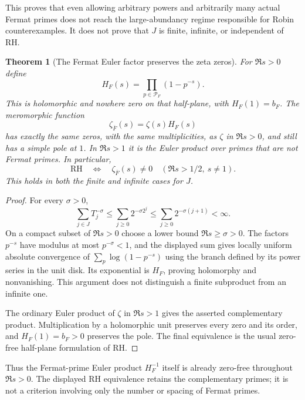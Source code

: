 \documentclass[11pt]{article}
\newtheorem{theorem}{Theorem}[section]
\theoremstyle{definition}
\begin{document}
This proves that even allowing arbitrary powers and arbitrarily
many actual Fermat primes does not reach the large-abundancy
regime responsible for Robin counterexamples. It does not prove
that $J$ is finite, infinite, or independent of RH.

\begin{theorem}[The Fermat Euler factor preserves the zeta zeros]
\label{thm:fermat-euler-zero-preservation}
For $\Re s>0$ define
\[
 H_F(s)=\prod_{p\in\mathcal P_F}(1-p^{-s}).
\]
This is holomorphic and nowhere zero on that half-plane, with
$H_F(1)=b_F$. The meromorphic function
\[
 \zeta_{\overline F}(s)=\zeta(s)H_F(s)
\]
has exactly the same zeros, with the same multiplicities, as
$\zeta$ in $\Re s>0$, and still has a simple pole at $1$.
In $\Re s>1$ it is the Euler product over primes that are not
Fermat primes. In particular,
\[
 \mathrm{RH}\quad\Longleftrightarrow\quad
 \zeta_{\overline F}(s)\ne0
 \quad(\Re s>1/2,\ s\ne1).
\]
This holds in both the finite and infinite cases for $J$.
\end{theorem}

\begin{proof}
For every $\sigma>0$,
\[
 \sum_{j\in J}T_j^{-\sigma}
 \le\sum_{j\ge0}2^{-\sigma 2^j}
 \le\sum_{j\ge0}2^{-\sigma(j+1)}<\infty.
\]
On a compact subset of $\Re s>0$ choose a lower bound
$\Re s\ge\sigma>0$. The factors $p^{-s}$ have modulus at most
$p^{-\sigma}<1$, and the displayed sum gives locally uniform
absolute convergence of $\sum_p\log(1-p^{-s})$ using the branch
defined by its power series in the unit disk. Its exponential
is $H_F$, proving holomorphy and nonvanishing. This argument
does not distinguish a finite subproduct from an infinite one.

The ordinary Euler product of $\zeta$ in $\Re s>1$ gives the
asserted complementary product. Multiplication by a holomorphic
unit preserves every zero and its order, and $H_F(1)=b_F>0$
preserves the pole. The final equivalence is the usual zero-free
half-plane formulation of RH.
\end{proof}

Thus the Fermat-prime Euler product $H_F^{-1}$ itself is
already zero-free throughout $\Re s>0$. The displayed RH
equivalence retains the complementary primes; it is not a
criterion involving only the number or spacing of Fermat primes.
\end{document}
